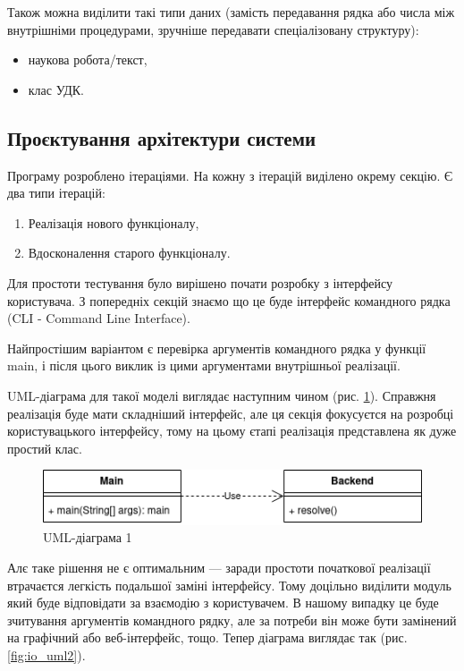 \documentclass[14pt]{extarticle}
\begin{document}
  Також можна виділити такі типи даних (замість передавання рядка або числа між внутрішніми процедурами, зручніше передавати спеціалізовану структуру):
  \begin{itemize}[labelindent=\dimexpr{}\relax, leftmargin=*]
    \item наукова робота/текст,
    \item клас УДК.
  \end{itemize}

  \subsection{Проєктування архітектури системи}
  Програму розроблено ітераціями. На кожну з ітерацій виділено окрему секцію. Є два типи ітерацій:
  \begin{enumerate}[labelindent=\dimexpr\parindent*2\relax, leftmargin=*]
    \item Реалізація нового функціоналу,
    \item Вдосконалення старого функціоналу.
  \end{enumerate}
  Для простоти тестування було вирішено почати розробку з інтерфейсу користувача.
  З попередніх секцій знаємо що це буде інтерфейс командного рядка
  (CLI - Command Line Interface).

  Найпростішим варіантом
  є перевірка аргументів командного рядка у функції main,
  і після цього виклик із цими аргументами внутрішньої реалізації.

  UML-діаграма для такої моделі виглядає наступним чином
  (рис. \ref{fig:io_uml1}).
  Справжня реалізація буде мати складніший інтерфейс,
  але ця секція фокусуєтся на розробці користувацького інтерфейсу,
  тому на цьому єтапі реалізація представлена як дуже простий клас.

  \begin{figure}[H]
    \centering
    \includegraphics{io_uml1.drawio.png}    
    \caption{UML-діаграма 1}
    \label{fig:io_uml1}
  \end{figure}

  Алє таке рішення не є оптимальним ---
  заради простоти початкової реалізації
  втрачаєтся легкість подальшої заміні інтерфейсу.
  Тому доцільно виділити модуль який буде відповідати
  за взаємодію з користувачем.
  В нашому випадку це буде зчитування аргументів командного рядку,
  але за потреби він може бути замінений на графічний або веб-інтерфейс, тощо.
  Тепер діаграма виглядає так (рис. \ref{fig:io_uml2}).
\end{document}
